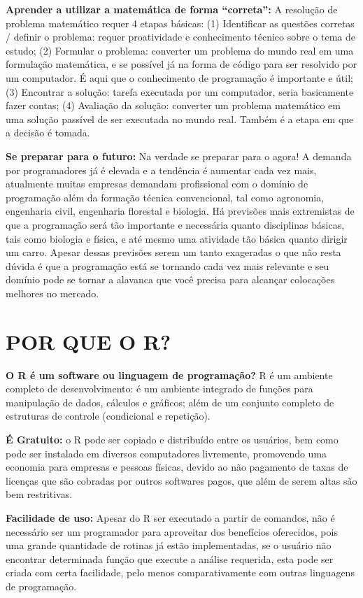 \documentclass[
  11pt,
  a5paper,
  openany]{book}
\begin{document}
\textbf{Aprender a utilizar a matemática de forma ``correta'':} A resolução de problema matemático requer 4 etapas básicas: (1) Identificar as questões corretas / definir o problema: requer proatividade e conhecimento técnico sobre o tema de estudo; (2) Formular o problema: converter um problema do mundo real em uma formulação matemática, e se possível já na forma de código para ser resolvido por um computador. É aqui que o conhecimento de programação é importante e útil; (3) Encontrar a solução: tarefa executada por um computador, seria basicamente fazer contas; (4) Avaliação da solução: converter um problema matemático em uma solução passível de ser executada no mundo real. Também é a etapa em que a decisão é tomada.

\textbf{Se preparar para o futuro:} Na verdade se preparar para o agora! A demanda por programadores já é elevada e a tendência é aumentar cada vez mais, atualmente muitas empresas demandam profissional com o domínio de programação além da formação técnica convencional, tal como agronomia, engenharia civil, engenharia florestal e biologia. Há previsões mais extremistas de que a programação será tão importante e necessária quanto disciplinas básicas, tais como biologia e física, e até mesmo uma atividade tão básica quanto dirigir um carro. Apesar dessas previsões serem um tanto exageradas o que não resta dúvida é que a programação está se tornando cada vez mais relevante e seu domínio pode se tornar a alavanca que você precisa para alcançar colocações melhores no mercado.

\hypertarget{por-que-o-r}{%
\chapter{POR QUE O R?}\label{por-que-o-r}}

\textbf{O R é um software ou linguagem de programação?} R é um ambiente completo de desenvolvimento: é um ambiente integrado de funções para manipulação de dados, cálculos e gráficos; além de um conjunto completo de estruturas de controle (condicional e repetição).

\textbf{É Gratuito:} o R pode ser copiado e distribuído entre os usuários, bem como pode ser instalado em diversos computadores livremente, promovendo uma economia para empresas e pessoas físicas, devido ao não pagamento de taxas de licenças que são cobradas por outros softwares pagos, que além de serem altas são bem restritivas.

\textbf{Facilidade de uso:} Apesar do R ser executado a partir de comandos, não é necessário ser um programador para aproveitar dos benefícios oferecidos, pois uma grande quantidade de rotinas já estão implementadas, se o usuário não encontrar determinada função que execute a análise requerida, esta pode ser criada com certa facilidade, pelo menos comparativamente com outras linguagens de programação.
\end{document}
